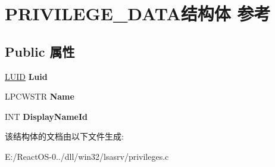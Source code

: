 \hypertarget{struct_p_r_i_v_i_l_e_g_e___d_a_t_a}{}\section{P\+R\+I\+V\+I\+L\+E\+G\+E\+\_\+\+D\+A\+T\+A结构体 参考}
\label{struct_p_r_i_v_i_l_e_g_e___d_a_t_a}
\subsection*{Public 属性}
\begin{DoxyCompactItemize}
\item 
\mbox{\label{struct_p_r_i_v_i_l_e_g_e___d_a_t_a_a60b1ba0a53e2974b7569c247b5c92da9}} 
\hyperlink{struct___l_u_i_d}{L\+U\+ID} {\bfseries Luid}
\item 
\mbox{\label{struct_p_r_i_v_i_l_e_g_e___d_a_t_a_a1baeb81245e7874ad2b522c8371ab071}} 
L\+P\+C\+W\+S\+TR {\bfseries Name}
\item 
\mbox{\label{struct_p_r_i_v_i_l_e_g_e___d_a_t_a_aeade041612a198d04525aeb00f37e29b}} 
I\+NT {\bfseries Display\+Name\+Id}
\end{DoxyCompactItemize}


该结构体的文档由以下文件生成\+:\begin{DoxyCompactItemize}
\item 
E\+:/\+React\+O\+S-\/0../dll/win32/lsasrv/privileges.\+c\end{DoxyCompactItemize}
